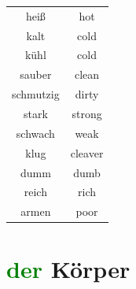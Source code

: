 \begin{center}
\begin{tabular} {|c|c|}
        heiß        & hot               \\
        kalt        & cold              \\
        kühl        & cold              \\
        \hline
        sauber      & clean             \\
        schmutzig   & dirty             \\
        \hline
        stark       & strong            \\
        schwach     & weak              \\
        \hline
        klug        & cleaver           \\
        dumm        & dumb              \\
        \hline
        reich       & rich              \\
        armen       & poor              \\
        \hline
    \end{tabular}
\end{center}

\section{\textcolor{green}{der} Körper}

